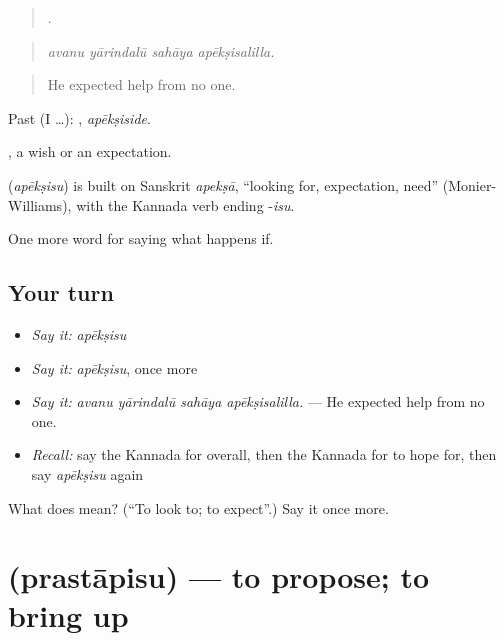 \begin{quote}
   .
\end{quote}

\begin{quote}
\emph{avanu yārindalū sahāya apēkṣisalilla.}
\end{quote}

\begin{quote}
He expected help from no one.
\end{quote}

Past (I …): , \emph{apēkṣiside}.

, a wish or an expectation.

\begin{cousinweb}
\textbf{} (\emph{apēkṣisu}) is built on Sanskrit \emph{apekṣā}, \textquotedblleft{}looking for, expectation, need\textquotedblright{} (Monier-Williams), with the Kannada verb ending -\emph{isu}.
\end{cousinweb}

\begin{grammarlens}[title={What you've built}]
One more word for saying what happens if.
\end{grammarlens}

\subsection*{Your turn}
\begin{itemize}
\raggedright
  \item \emph{Say it:} \emph{apēkṣisu}
  \item \emph{Say it:} \emph{apēkṣisu}, once more
  \item \emph{Say it:} \emph{avanu yārindalū sahāya apēkṣisalilla.} — He expected help from no one.
  \item \emph{Recall:} say the Kannada for overall, then the Kannada for to hope for, then say \emph{apēkṣisu} again
\end{itemize}

\begin{tcolorbox}[breakable,colback=teal!4,colframe=teal!35!black,title={Before you move on}]
What does  mean? (\textquotedblleft{}To look to; to expect\textquotedblright{}.) Say it once more.
\end{tcolorbox}
\section[\texorpdfstring{\kn{ಪ್ರಸ್ತಾಪಿಸು} (prastāpisu)}{ಪ್ರಸ್ತಾಪಿಸು (prastāpisu)}]{ (prastāpisu) — to propose; to bring up}

